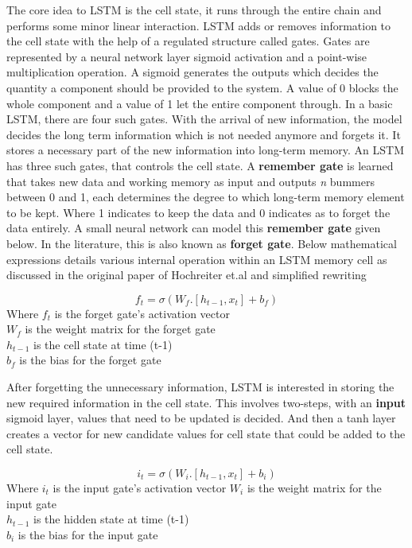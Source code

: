 The core idea to LSTM is the cell state, it runs through the entire chain and performs some minor linear interaction. LSTM adds or removes information to the cell state with the help of a regulated structure called gates. Gates are represented by a neural network layer sigmoid activation and a point-wise multiplication operation.
A sigmoid generates the outputs which decides the quantity a component should be provided to the system. A value of 0 blocks the whole component and a value of 1 let the entire component through. In a basic LSTM, there are four such gates.
With the arrival of new information, the model decides the long term information which is not needed anymore and forgets it. It stores a necessary part of the new information into long-term memory. An LSTM has three such gates, that controls the cell state.
A \textbf{remember gate} is learned that takes new data and working memory as input and outputs \textit{n} bummers between 0 and 1, each determines the degree to which long-term memory element to be kept. Where 1 indicates to keep the data and 0 indicates as to forget the data entirely. A small neural network can model this \textbf{remember gate} given below. In the literature, this is also known as \textbf{forget gate}. Below mathematical expressions details various internal operation within an LSTM memory cell as discussed in the original paper of Hochreiter et.al \cite{hochreiter1997long} and simplified rewriting \cite{christopherolah}

\begin{equation}
f_t = \sigma(W_f. [h_{t-1}, x_t  ] + b_f)
\end{equation}
Where $f_t$ is the forget gate's activation vector \\
$W_f$ is the weight matrix for the forget gate \\
$h_{t-1}$ is the cell state at time (t-1) \\
$b_f$ is the bias for the forget gate

After forgetting the unnecessary information, LSTM is interested in storing the new required information in the cell state. This involves two-steps, with an \textbf{input} sigmoid layer, values that need to be updated is decided. And then a tanh layer creates a vector for new candidate values for cell state that could be added to the cell state. 

\begin{equation}
i_t = \sigma(W_i. [h_{t-1}, x_t  ] + b_i)
\end{equation}
Where $i_t$ is the input gate's activation vector 
$W_i$ is the weight matrix for the input gate \\
$h_{t-1}$ is the hidden state at time (t-1) \\
$b_i$ is the bias for the input gate

